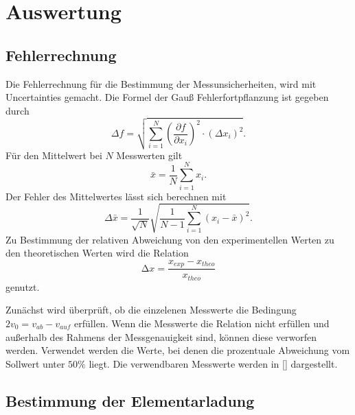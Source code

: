 \section{Auswertung}
\label{sec:auswertung}


\subsection{Fehlerrechnung}
\label{sec:Fehlerrechnung}
Die Fehlerrechnung für die Bestimmung der Messunsicherheiten, wird mit Uncertainties \cite{uncertainties} gemacht.
Die Formel der Gauß Fehlerfortpflanzung ist gegeben durch
\begin{equation}
    \Delta f=\sqrt{\sum_{i=1}^N\left(\frac{\partial f}{\partial x_i}\right)^2 \cdot\left(\Delta x_i\right)^2}.
    \label{eqn:gauss}
\end{equation}
Für den Mittelwert bei $N$ Messwerten gilt 
\begin{equation}
    \bar{x} = \frac{1}{N}\sum\limits_{i = 1}^N x_i .
    \label{eqn:mittelwert}
\end{equation}
Der Fehler des Mittelwertes lässt sich berechnen mit
\begin{equation}
    \Delta \bar{x}=\frac{1}{\sqrt{N}} \sqrt{\frac{1}{N-1} \sum_{i=1}^N\left(x_i-\bar{x}\right)^2}.
    \label{eqn:mittelwertfehler}
\end{equation}
Zu Bestimmung der relativen Abweichung von den experimentellen Werten zu den theoretischen Werten wird die
Relation 
\begin{equation}
    \increment x = \frac{x_{exp}-x_{theo}}{x_{theo}}
\end{equation} 
genutzt.

Zunächst wird überprüft, ob die einzelenen Messwerte die Bedingung $2v_0 = v_{ab}-v_{auf}$ erfüllen.
Wenn die Messwerte die Relation nicht erfüllen und außerhalb des Rahmens der Messgenauigkeit sind, können 
diese verworfen werden. Verwendet werden die Werte, bei denen die prozentuale Abweichung vom Sollwert unter
$50 \%$ liegt. Die verwendbaren Messwerte werden in \autoref{} dargestellt.

\subsection{Bestimmung der Elementarladung}
\label{bestimmung der elementarladung}

